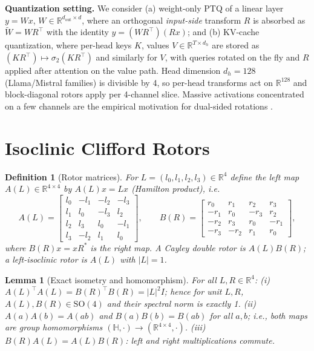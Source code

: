 \documentclass{article}
\newtheorem{lemma}{Lemma}
\newtheorem{definition}{Definition}
\newcommand{\R}{\mathbb{R}}
\newcommand{\SO}{\mathrm{SO}}
\begin{document}
\textbf{Quantization setting.} We consider (a) weight-only PTQ of a linear
layer $y=Wx$, $W\in\R^{d_{\text{out}}\times d}$, where an orthogonal
\emph{input-side} transform $R$ is absorbed as $\tilde W=WR^\top$ with the
identity $y=(WR^\top)(Rx)$; and (b) KV-cache quantization, where per-head keys
$K$, values $V\in\R^{T\times d_h}$ are stored as
$(KR^\top)\mapsto\sigma_2(KR^\top)$ and similarly for $V$, with queries
rotated on the fly and $R$ applied after attention on the value path. Head
dimension $d_h=128$ (Llama/Mistral families) is divisible by 4, so per-head
transforms act on $\R^{128}$ and block-diagonal rotors apply per 4-channel
slice. Massive activations concentrated on a few channels
\citep{sun2024massive} are the empirical motivation for dual-sided rotations
\citep{su2025rotatekv}.

\section{Isoclinic Clifford Rotors}
\label{sec:rotors}

\begin{definition}[Rotor matrices]
\label{def:rotor}
For $L=(l_0,l_1,l_2,l_3)\in\R^4$ define the \emph{left} map
$A(L)\in\R^{4\times4}$ by $A(L)x=Lx$ (Hamilton product), i.e.
\[
A(L)=\begin{bmatrix}
 l_0&-l_1&-l_2&-l_3\\
 l_1& l_0&-l_3& l_2\\
 l_2& l_3& l_0&-l_1\\
 l_3&-l_2& l_1& l_0
\end{bmatrix},
\qquad
B(R)=\begin{bmatrix}
 r_0& r_1& r_2& r_3\\
-r_1& r_0&-r_3& r_2\\
-r_2& r_3& r_0&-r_1\\
-r_3&-r_2& r_1& r_0
\end{bmatrix},
\]
where $B(R)x=xR^{*}$ is the \emph{right} map. A \emph{Cayley double rotor} is
$A(L)B(R)$; a \emph{left-isoclinic rotor} is $A(L)$ with $|L|=1$.
\end{definition}

\begin{lemma}[Exact isometry and homomorphism]
\label{lem:iso}
For all $L,R\in\R^4$: (i) $A(L)^\top A(L)=B(R)^\top B(R)=|L|^2I$; hence for
unit $L,R$, $A(L),B(R)\in\SO(4)$ and their spectral norm is exactly 1.
(ii) $A(a)A(b)=A(ab)$ and $B(a)B(b)=B(ab)$ for all $a,b$; i.e., both maps are
group homomorphisms $(\mathbb{H},\cdot)\to(\R^{4\times4},\cdot)$. (iii)
$B(R)A(L)=A(L)B(R)$: left and right multiplications commute.
\end{lemma}
\end{document}
